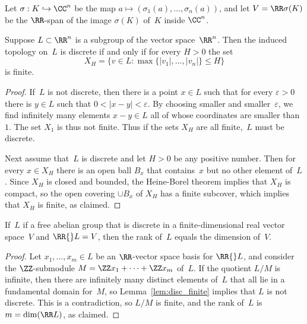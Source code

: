 Let $\sigma:K \hookrightarrow \CC^n$ be the map $a\mapsto
(\sigma_1(a),\dots,\sigma_n(a))$, and let $V=\RR\sigma(K)$ be the
$\RR$-span of the image $\sigma(K)$ of~$K$ inside $\CC^n$.

\begin{lemma}\label{lem:disc_finite}
  Suppose $L\subset \RR^n$ is a subgroup of the vector space~$\RR^n$.
  Then the induced topology on~$L$ is discrete if and only
  if for every  $H>0$ the set
  \[
    X_H = \{v \in L : \max\{|v_1|,\dots,|v_n|\} \leq H \}
  \]
  is finite.
\end{lemma}
\begin{proof}
  If~$L$ is not discrete, then there is a point $x \in L$ such that
  for every $\varepsilon > 0$ there is $y \in L$ such that
  $0 < |x-y| < \varepsilon$. By choosing smaller and smaller~$\varepsilon$,
  we find infinitely many elements $x-y\in L$
  all of whose coordinates are smaller than~$1$.
  The set $X_1$ is thus not finite.   Thus if the sets
  $X_H$ are all finite,~$L$ must be discrete.

  Next assume that~$L$ is discrete and let $H>0$ be any positive number.
  Then for every $x\in X_H$ there is an open ball $B_x$ that
  contains~$x$ but no other element of~$L$.  Since $X_H$ is closed and
  bounded, the Heine-Borel theorem implies that $X_H$ is compact, so the
  open covering $\cup B_x$ of $X_H$ has a finite subcover, which
  implies that $X_H$ is finite, as claimed.
\end{proof}

\begin{lemma}\label{lem:disc_rankdim}
  If~$L$ if a free abelian group that is
  discrete in a finite-dimensional
  real vector space~$V$ and $\RR{}L=V$, then the rank of~$L$
  equals the dimension of~$V$.
\end{lemma}
\begin{proof}
  Let $x_1,\dots, x_m \in L$ be an $\RR$-vector space basis for
  $\RR{}L$, and consider the $\ZZ$-submodule $M=\ZZ x_1 + \cdots + \ZZ
  x_m$ of~$L$.  If the quotient $L/M$ is infinite, then there are
  infinitely many distinct elements of~$L$ that all lie in a
  fundamental domain for~$M$, so Lemma~\ref{lem:disc_finite} implies
  that $L$ is not discrete.  This is a contradiction, so $L/M$ is
  finite, and the rank of~$L$ is $m=\dim(\RR L)$, as claimed.
\end{proof}

